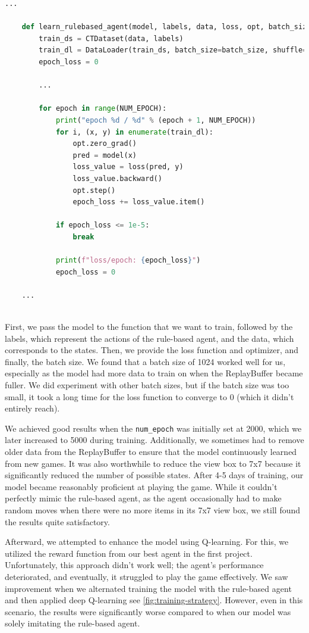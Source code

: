 \begin{lstlisting}[language=Python]
    ...
    
    def learn_rulebased_agent(model, labels, data, loss, opt, batch_size):
        train_ds = CTDataset(data, labels)
        train_dl = DataLoader(train_ds, batch_size=batch_size, shuffle=True)
        epoch_loss = 0

        ...

        for epoch in range(NUM_EPOCH):
            print("epoch %d / %d" % (epoch + 1, NUM_EPOCH))
            for i, (x, y) in enumerate(train_dl):
                opt.zero_grad()
                pred = model(x)
                loss_value = loss(pred, y) 
                loss_value.backward() 
                opt.step()
                epoch_loss += loss_value.item() 

            if epoch_loss <= 1e-5:
                break

            print(f"loss/epoch: {epoch_loss}")
            epoch_loss = 0      

    ...
    
\end{lstlisting}

First, we pass the model to the function that we want to train, followed by the labels, 
which represent the actions of the rule-based agent, and the data, which corresponds to the states. 
Then, we provide the loss function and optimizer, and finally, the batch size. We found that a batch size of 1024 worked well for us, 
especially as the model had more data to train on when the ReplayBuffer became fuller. We did experiment with other batch sizes,
but if the batch size was too small, it took a long time for the loss function to converge to 0 (which it didn't entirely reach).

We achieved good results when the \verb|num_epoch| was initially set at 2000, which we later increased to 5000 during training. 
Additionally, we sometimes had to remove older data from the ReplayBuffer to ensure that the model continuously learned from new games. 
It was also worthwhile to reduce the view box to 7x7 because it significantly reduced the number of possible states. 
After 4-5 days of training, our model became reasonably proficient at playing the game. While it couldn't perfectly mimic the rule-based agent, 
as the agent occasionally had to make random moves when there were no more items in its 7x7 view box, we still found the results quite satisfactory.

Afterward, we attempted to enhance the model using Q-learning. For this, we utilized the reward function from our best agent in the first project. 
Unfortunately, this approach didn't work well; the agent's performance deteriorated, and eventually, it struggled to play the game effectively. 
We saw improvement when we alternated training the model with the rule-based agent and then applied deep Q-learning see \autoref{fig:training-strategy}. 
However, even in this scenario, 
the results were significantly worse compared to when our model was solely imitating the rule-based agent.

